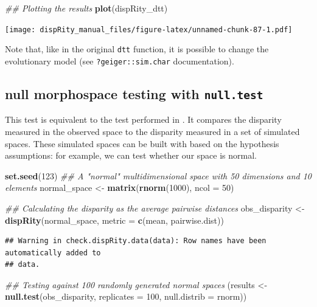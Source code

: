 \documentclass[]{book}
\newenvironment{Shaded}{\begin{snugshade}}{\end{snugshade}}
\newcommand{\CommentTok}[1]{\textcolor[rgb]{0.56,0.35,0.01}{\textit{#1}}}
\newcommand{\DataTypeTok}[1]{\textcolor[rgb]{0.13,0.29,0.53}{#1}}
\newcommand{\DecValTok}[1]{\textcolor[rgb]{0.00,0.00,0.81}{#1}}
\newcommand{\KeywordTok}[1]{\textcolor[rgb]{0.13,0.29,0.53}{\textbf{#1}}}
\newcommand{\NormalTok}[1]{#1}
\newcommand{\StringTok}[1]{\textcolor[rgb]{0.31,0.60,0.02}{#1}}
\begin{document}
\begin{Shaded}
\begin{Highlighting}[]
\CommentTok{## Plotting the results}
\KeywordTok{plot}\NormalTok{(dispRity_dtt)}
\end{Highlighting}
\end{Shaded}

\texttt{[image: dispRity\_manual\_files/figure-latex/unnamed-chunk-87-1.pdf]}

Note that, like in the original \texttt{dtt} function, it is possible to change the evolutionary model (see \texttt{?geiger::sim.char} documentation).

\hypertarget{null-test}{%
\subsection{\texorpdfstring{null morphospace testing with \texttt{null.test}}{null morphospace testing with null.test}}\label{null-test}}

This test is equivalent to the test performed in \citet{diaz2016global}.
It compares the disparity measured in the observed space to the disparity measured in a set of simulated spaces.
These simulated spaces can be built with based on the hypothesis assumptions: for example, we can test whether our space is normal.

\begin{Shaded}
\begin{Highlighting}[]
\KeywordTok{set.seed}\NormalTok{(}\DecValTok{123}\NormalTok{)}
\CommentTok{## A "normal" multidimensional space with 50 dimensions and 10 elements}
\NormalTok{normal_space <-}\StringTok{ }\KeywordTok{matrix}\NormalTok{(}\KeywordTok{rnorm}\NormalTok{(}\DecValTok{1000}\NormalTok{), }\DataTypeTok{ncol =} \DecValTok{50}\NormalTok{)}

\CommentTok{## Calculating the disparity as the average pairwise distances}
\NormalTok{obs_disparity <-}\StringTok{ }\KeywordTok{dispRity}\NormalTok{(normal_space,}
                          \DataTypeTok{metric =} \KeywordTok{c}\NormalTok{(mean, pairwise.dist))}
\end{Highlighting}
\end{Shaded}

\begin{verbatim}
## Warning in check.dispRity.data(data): Row names have been automatically added to
## data.
\end{verbatim}

\begin{Shaded}
\begin{Highlighting}[]
\CommentTok{## Testing against 100 randomly generated normal spaces}
\NormalTok{(results <-}\StringTok{ }\KeywordTok{null.test}\NormalTok{(obs_disparity, }\DataTypeTok{replicates =} \DecValTok{100}\NormalTok{,}
                      \DataTypeTok{null.distrib =}\NormalTok{ rnorm))}
\end{Highlighting}
\end{Shaded}
\end{document}
